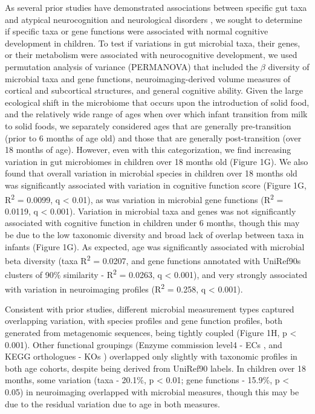 \documentclass{article}
\begin{document}
As several prior studies have demonstrated associations between specific gut taxa
and atypical neurocognition and neurological disorders
\cite{liuAlteredGutMicrobiota2019,wanUnderdevelopmentGutMicrobiota2021,
      magnussonRelationshipsDietrelatedChanges2015,mayneris-perxachsMicrobiotaAlterationsProline2022,
      needhamGutderivedMetaboliteAlters2022},
we sought to determine if specific taxa or gene functions were associated
with normal cognitive development in children.
To test if variations in gut microbial taxa,
their genes, or their metabolism were associated with neurocognitive
development, we used permutation analysis of variance (PERMANOVA) 
that included the $\beta$ diversity of microbial taxa and gene functions,
neuroimaging-derived volume measures of cortical and subcortical structures,
and general cognitive ability.
Given the large ecological shift in the microbiome that occurs upon the introduction of solid food,
and the relatively wide range of ages when over which infant transition from milk to solid foods,
we separately considered ages that are generally pre-transition (prior to 6 months of age old)
and those that are generally post-transition (over 18 months of age).
However, even with this categorization, we find increasing variation
in gut microbiomes in children over 18 months old (Figure 1G).
We also found that overall variation in microbial species in children over 18 months old
was significantly associated with variation in cognitive function score
(Figure 1G, R\textsuperscript{2} = 0.0099, q \textless{} 0.01),
as was variation in microbial gene functions (R\textsuperscript{2} = 0.0119, q \textless{} 0.001).
Variation in microbial taxa and genes was not significantly associated with cognitive
function in children under 6 months, though this may be due to the low
taxonomic diversity and broad lack of overlap between taxa in infants (Figure 1G).
As expected, age was significantly associated with microbial beta
diversity (taxa R\textsuperscript{2} = 0.0207, and  gene functions
annotated with UniRef90s clusters of 90\% similarity
\cite{suzekUniRefComprehensiveNonredundant2007} -
R\textsuperscript{2} = 0.0263, q \textless{} 0.001), and very strongly
associated with variation in neuroimaging profiles (R\textsuperscript{2} = 0.258, q
\textless{} 0.001).

Consistent with prior studies, different microbial measurement types
captured overlapping variation, with species profiles and gene function
profiles, both generated from metagenomic sequences, being tightly coupled
(Figure 1H, p \textless{} 0.001). Other functional
groupings (Enzyme commission level4 - ECs
\cite{bairochENZYMEDatabase20002000},
and KEGG orthologues - KOs
\cite{kanehisaKEGGResourceDeciphering2004})
overlapped only slightly with taxonomic profiles in both age
cohorts, despite being derived from UniRef90 labels. In children over 18
months, some variation (taxa - 20.1\%, p \textless{} 0.01;
gene functions - 15.9\%, p \textless{} 0.05) in neuroimaging
overlapped with microbial measures, though this may be due to the
residual variation due to age in both measures.
\end{document}
